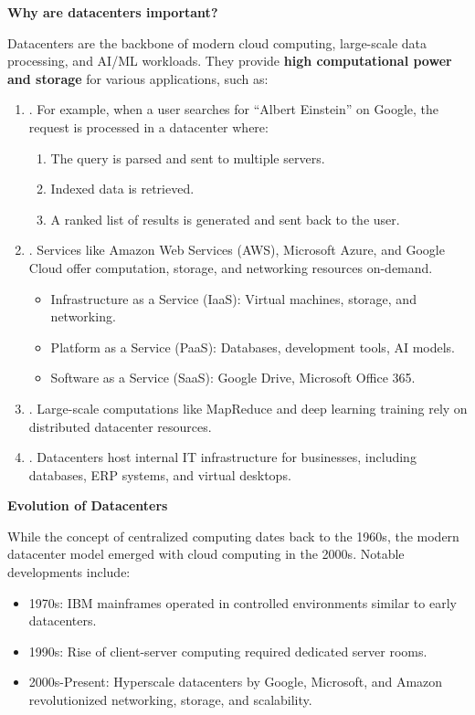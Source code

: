 \highspace
\begin{flushleft}
    \textcolor{Green3}{ \textbf{Why are datacenters important?}}
\end{flushleft}
Datacenters are the backbone of modern cloud computing, large-scale data processing, and AI/ML workloads. They provide \textbf{high computational power and storage} for various applications, such as:
\begin{enumerate}
    \item {}. For example, when a user searches for ``Albert Einstein'' on Google, the request is processed in a datacenter where:
    \begin{enumerate}
        \item The query is parsed and sent to multiple servers.
        \item Indexed data is retrieved.
        \item A ranked list of results is generated and sent back to the user.
    \end{enumerate}

    \item {}. Services like Amazon Web Services (AWS), Microsoft Azure, and Google Cloud offer computation, storage, and networking resources on-demand.
    \begin{itemize}
        \item Infrastructure as a Service (IaaS): Virtual machines, storage, and networking.
        \item Platform as a Service (PaaS): Databases, development tools, AI models.
        \item Software as a Service (SaaS): Google Drive, Microsoft Office 365.
    \end{itemize}

    \item {}. Large-scale computations like MapReduce and deep learning training rely on distributed datacenter resources.

    \item {}. Datacenters host internal IT infrastructure for businesses, including databases, ERP systems, and virtual desktops.
\end{enumerate}

\highspace
\begin{flushleft}
    \textcolor{Green3}{ \textbf{Evolution of Datacenters}}
\end{flushleft}
While the concept of centralized computing dates back to the 1960s, the modern datacenter model emerged with cloud computing in the 2000s. Notable developments include:
\begin{itemize}
    \item 1970s: IBM mainframes operated in controlled environments similar to early datacenters.
    \item 1990s: Rise of client-server computing required dedicated server rooms.
    \item 2000s-Present: Hyperscale datacenters by Google, Microsoft, and Amazon revolutionized networking, storage, and scalability.
\end{itemize}

